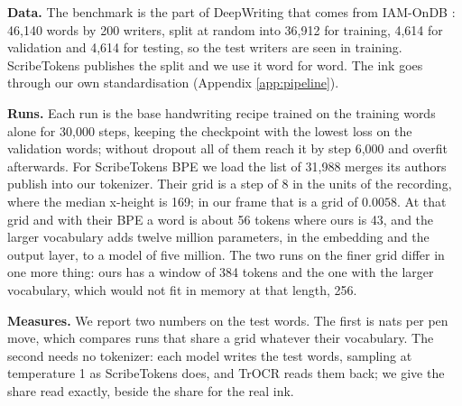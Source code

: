 \documentclass{article}
\begin{document}
\textbf{Data.} The benchmark is the part of DeepWriting \citep{aksan2018deepwriting} that comes from IAM-OnDB \citep{liwicki2005iam}: 46,140 words by 200 writers, split at random into 36,912 for training, 4,614 for validation and 4,614 for testing, so the test writers are seen in training. ScribeTokens publishes the split and we use it word for word. The ink goes through our own standardisation (Appendix \ref{app:pipeline}).

\textbf{Runs.} Each run is the base handwriting recipe trained on the training words alone for 30,000 steps, keeping the checkpoint with the lowest loss on the validation words; without dropout all of them reach it by step 6,000 and overfit afterwards. For ScribeTokens BPE we load the list of 31,988 merges its authors publish into our tokenizer. Their grid is a step of 8 in the units of the recording, where the median x-height is 169; in our frame that is a grid of $0.0058$. At that grid and with their BPE a word is about 56 tokens where ours is 43, and the larger vocabulary adds twelve million parameters, in the embedding and the output layer, to a model of five million. The two runs on the finer grid differ in one more thing: ours has a window of 384 tokens and the one with the larger vocabulary, which would not fit in memory at that length, 256.

\textbf{Measures.} We report two numbers on the test words. The first is nats per pen move, which compares runs that share a grid whatever their vocabulary. The second needs no tokenizer: each model writes the test words, sampling at temperature 1 as ScribeTokens does, and TrOCR reads them back; we give the share read exactly, beside the share for the real ink.
\end{document}
